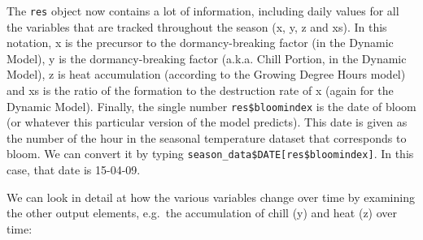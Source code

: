 \documentclass[
]{book}
\newenvironment{Shaded}{\begin{snugshade}}{\end{snugshade}}
\newcommand{\DataTypeTok}[1]{\textcolor[rgb]{0.13,0.29,0.53}{#1}}
\newcommand{\DecValTok}[1]{\textcolor[rgb]{0.00,0.00,0.81}{#1}}
\newcommand{\KeywordTok}[1]{\textcolor[rgb]{0.13,0.29,0.53}{\textbf{#1}}}
\newcommand{\NormalTok}[1]{#1}
\newcommand{\OperatorTok}[1]{\textcolor[rgb]{0.81,0.36,0.00}{\textbf{#1}}}
\newcommand{\OtherTok}[1]{\textcolor[rgb]{0.56,0.35,0.01}{#1}}
\newcommand{\StringTok}[1]{\textcolor[rgb]{0.31,0.60,0.02}{#1}}
\begin{document}
\begin{Shaded}
\end{Shaded}

The \texttt{res} object now contains a lot of information, including daily values for all the variables that are tracked throughout the season (x, y, z and xs). In this notation, x is the precursor to the dormancy-breaking factor (in the Dynamic Model), y is the dormancy-breaking factor (a.k.a. Chill Portion, in the Dynamic Model), z is heat accumulation (according to the Growing Degree Hours model) and xs is the ratio of the formation to the destruction rate of x (again for the Dynamic Model). Finally, the single number \texttt{res\$bloomindex} is the date of bloom (or whatever this particular version of the model predicts). This date is given as the number of the hour in the seasonal temperature dataset that corresponds to bloom. We can convert it by typing \texttt{season\_data\$DATE{[}res\$bloomindex{]}}. In this case, that date is 15-04-09.

We can look in detail at how the various variables change over time by examining the other output elements, e.g.~the accumulation of chill (y) and heat (z) over time:
\end{document}
